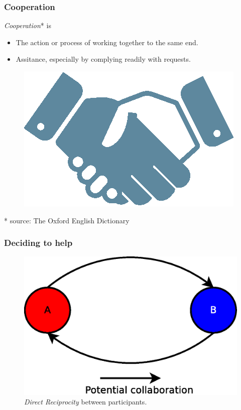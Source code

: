 \documentclass{beamer}
\begin{document}
\begin{frame}
\frametitle{Cooperation}
    \begin{definition}
		\emph{Cooperation}* is
		 \begin{itemize}[<+(1)->]
		    \item The action or process of working together to the same end.
		    \item Assitance, especially by complying readily with requests.
		 \end{itemize}
     \end{definition}
    \begin{figure}
        \centerline{\includegraphics[scale=1]{images/problem/handshake.eps}}
    \end{figure}
    * source: The Oxford English Dictionary
\end{frame}

\begin{frame}
\frametitle{Deciding to help}
    \begin{figure}
        \centerline{\includegraphics[scale=0.3]{images/problem/direct-reciprocity.eps}}
        \caption{\emph{Direct Reciprocity} between participants.}
        \label{fig:direct-reciprocity}
    \end{figure}
\end{frame}
\end{document}

